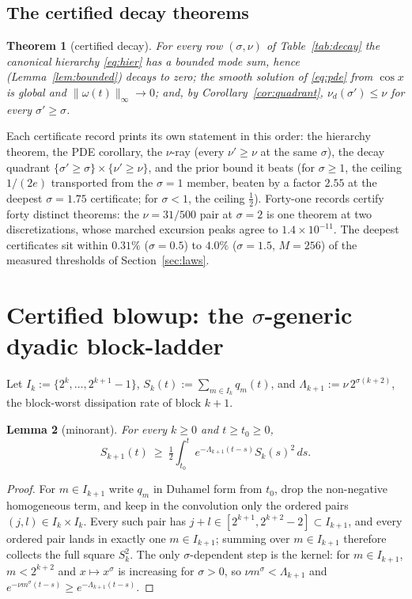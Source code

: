 \documentclass[11pt,a4paper]{article}
\theoremstyle{plain}
\newtheorem{theorem}{Theorem}[section]
\newtheorem{lemma}[theorem]{Lemma}
\theoremstyle{definition}
\newcommand{\nrm}[1]{\lVert #1 \rVert}
\begin{document}
\subsection{The certified decay theorems}
\begin{theorem}[certified decay]\label{thm:decay}
For every row $(\sigma,\nu)$ of Table~\ref{tab:decay} the canonical hierarchy \eqref{eq:hier} has a bounded mode sum, hence (Lemma~\ref{lem:bounded}) decays to zero; the smooth solution of \eqref{eq:pde} from $\cos x$ is global and $\nrm{\omega(t)}_\infty\to0$; and, by Corollary~\ref{cor:quadrant}, $\nu_d(\sigma')\le\nu$ for every $\sigma'\ge\sigma$.
\end{theorem}
Each certificate record prints its own statement in this order: the hierarchy theorem, the PDE corollary, the $\nu$-ray (every $\nu'\ge\nu$ at the same $\sigma$), the decay quadrant $\{\sigma'\ge\sigma\}\times\{\nu'\ge\nu\}$, and the prior bound it beats (for $\sigma\ge1$, the ceiling $1/(2e)$ transported from the $\sigma=1$ member, beaten by a factor $2.55$ at the deepest $\sigma=1.75$ certificate; for $\sigma<1$, the ceiling $\tfrac12$). Forty-one records certify forty distinct theorems: the $\nu=31/500$ pair at $\sigma=2$ is one theorem at two discretizations, whose marched excursion peaks agree to $1.4\times10^{-11}$. The deepest certificates sit within $0.31\%$ ($\sigma=0.5$) to $4.0\%$ ($\sigma=1.5$, $M=256$) of the measured thresholds of Section~\ref{sec:laws}.



\section{Certified blowup: the \texorpdfstring{$\sigma$}{sigma}-generic dyadic block-ladder}\label{sec:blowup}

Let $I_k:=\{2^k,\dots,2^{k+1}-1\}$, $S_k(t):=\sum_{m\in I_k}q_m(t)$, and $\Lambda_{k+1}:=\nu\,2^{\sigma(k+2)}$, the block-worst dissipation rate of block $k+1$.

\begin{lemma}[minorant]\label{lem:minorant}
For every $k\ge0$ and $t\ge t_0\ge0$,
\[
S_{k+1}(t)\ \ge\ \tfrac12\int_{t_0}^te^{-\Lambda_{k+1}(t-s)}S_k(s)^2\,ds.
\]
\end{lemma}
\begin{proof}
For $m\in I_{k+1}$ write $q_m$ in Duhamel form from $t_0$, drop the non-negative homogeneous term, and keep in the convolution only the ordered pairs $(j,l)\in I_k\times I_k$. Every such pair has $j+l\in[2^{k+1},2^{k+2}-2]\subset I_{k+1}$, and every ordered pair lands in exactly one $m\in I_{k+1}$; summing over $m\in I_{k+1}$ therefore collects the full square $S_k^2$. The only $\sigma$-dependent step is the kernel: for $m\in I_{k+1}$, $m<2^{k+2}$ and $x\mapsto x^\sigma$ is increasing for $\sigma>0$, so $\nu m^\sigma<\Lambda_{k+1}$ and $e^{-\nu m^\sigma(t-s)}\ge e^{-\Lambda_{k+1}(t-s)}$.
\end{proof}
\end{document}
